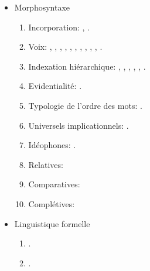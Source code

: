 \documentclass[oneside,a4paper,11pt]{article}
\newcommand{\langue}[2]{#2}
\begin{document}
\begin{itemize}
\begin{itemize}
\item \langue{Morphosyntax}{Morphosyntaxe}
\begin{enumerate}
\item  Incorporation: \citet{jacques11tangut.verb}, \citet{jacques12incorp}.
\item  \langue{Voice}{Voix}:  \citet{jacques07passif}, \citet{jacques10refl}, \citet{jacques12demotion}, \citet{jacques13derivational.khaling}, \citet{jacques13tropative}, \citet{jacques14antipassive}, \citet{jacques15derivational.khaling}, \citet{jacques15causative},  \citet{jacques15spontaneous},  \citealt{jacques16si}, \citet{jacques17generic}.
\item \langue{Hierarchical agreement}{Indexation hiérarchique}:  \citet{jacques10inverse},     \citet{jacques12khaling},   \citet{antonov14rtau}, \citet{jacques14inverse}, \citet{jacques14rtau}, \citet{jacques16th}.
\item \langue{Evidentiality}{Evidentialité}: \citet{jacques14auditory}.
\item \langue{Word-order typology}{Typologie de l'ordre des mots}: \citet{jacques13harmonization}.
\item \langue{Implicational universals}{Universels implicationnels}: \citet{antonov14need}.
\item \langue{Ideophones}{Idéophones}: \citet{japhug14ideophones}.
\item \langue{Relativization}{Relatives}: \citet{jacques16relatives}
\item \langue{Comparative clauses}{Comparatives}: \citet{jacques16comparative}
\item \langue{Complementation}{Complétives}: \citet{jacques16complementation}
\end{enumerate}

\item \langue{Formal linguistics}{Linguistique formelle}
\begin{enumerate}
\item \citet{walther14inv.canon}.
\item \citet{walther14compactness}.
\end{enumerate}


\end{itemize}
\end{itemize}
\end{document}
